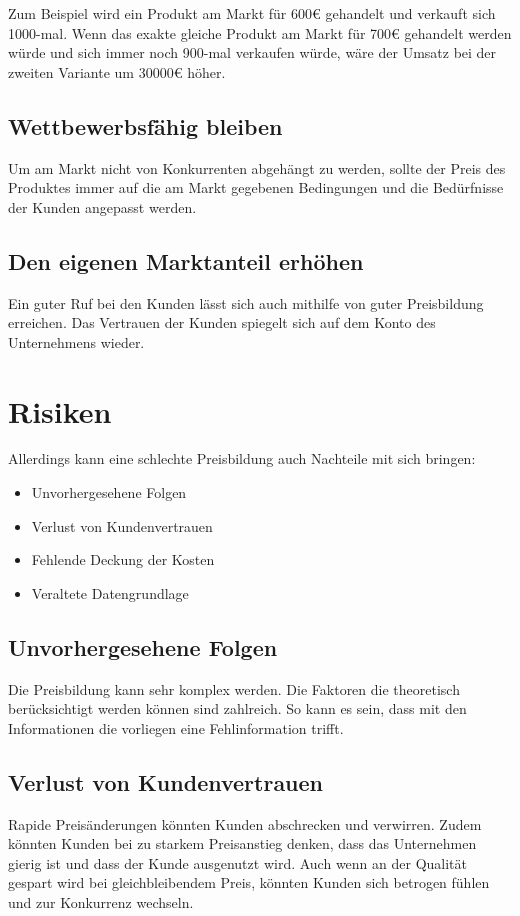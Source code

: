 Zum Beispiel wird ein Produkt am Markt für 600\euro{} gehandelt und verkauft sich 1000-mal. 
Wenn das exakte gleiche Produkt am Markt für 700\euro{} gehandelt werden würde und sich immer noch 900-mal verkaufen würde, wäre der Umsatz bei der zweiten Variante um 30000\euro{} höher. 

\subsection{Wettbewerbsfähig bleiben}
Um am Markt nicht von Konkurrenten abgehängt zu werden, sollte der Preis des Produktes immer auf die am Markt gegebenen Bedingungen und die Bedürfnisse der Kunden angepasst werden. 

\subsection{Den eigenen Marktanteil erhöhen}
Ein guter Ruf bei den Kunden lässt sich auch mithilfe von guter Preisbildung erreichen. Das Vertrauen der Kunden spiegelt sich auf dem Konto des Unternehmens wieder.

\clearpage{}

\section{Risiken}

Allerdings kann eine schlechte Preisbildung auch Nachteile mit sich bringen:
\begin{itemize}
  \item Unvorhergesehene Folgen
  \item Verlust von Kundenvertrauen
  \item Fehlende Deckung der Kosten
  \item Veraltete Datengrundlage
\end{itemize}

\subsection{Unvorhergesehene Folgen}
Die Preisbildung kann sehr komplex werden. Die Faktoren die theoretisch berücksichtigt werden können sind zahlreich. So kann es sein, dass mit den Informationen die vorliegen eine Fehlinformation trifft.

\subsection{Verlust von Kundenvertrauen}
Rapide Preisänderungen könnten Kunden abschrecken und verwirren. Zudem könnten Kunden bei zu starkem Preisanstieg denken, dass das Unternehmen gierig ist und dass der Kunde ausgenutzt wird. 
Auch wenn an der Qualität gespart wird bei gleichbleibendem Preis, könnten Kunden sich betrogen fühlen und zur Konkurrenz wechseln. 

